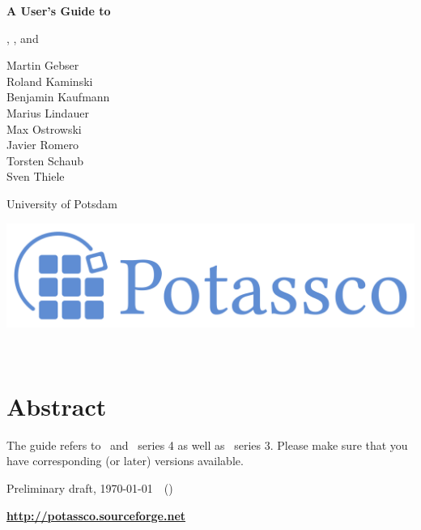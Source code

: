 \thispagestyle{empty}
\bigskip
\noindent
{\Huge\bf
A User's Guide to 
\par
\bigskip
\noindent
\gringo, \clasp, and \clingo}

\bigskip
\bigskip

\noindent
Martin Gebser \\
Roland Kaminski \\
Benjamin Kaufmann \\
Marius Lindauer \\
Max Ostrowski \\
Javier Romero \\
Torsten Schaub \\
Sven Thiele 
\par
\bigskip
\noindent
University of Potsdam

\vfill

\noindent
\includegraphics[width=\textwidth]{potassco_logo_blue}
\bigskip

\newpage
\thispagestyle{empty}\ 
\newpage
\thispagestyle{empty}\ 
\section*{Abstract}


\bigskip
\noindent
The guide refers to \gringo\ and \clingo\ series 4 as well as \clasp\ series 3.
Please make sure that you have corresponding (or later) versions available.

\vfill

\begin{center}
  
\end{center}

\vfill

\noindent
Preliminary draft, \today\ \ (\SVNREVISION)

\bigskip
\noindent
{\LARGE\bf\url{http://potassco.sourceforge.net}}





